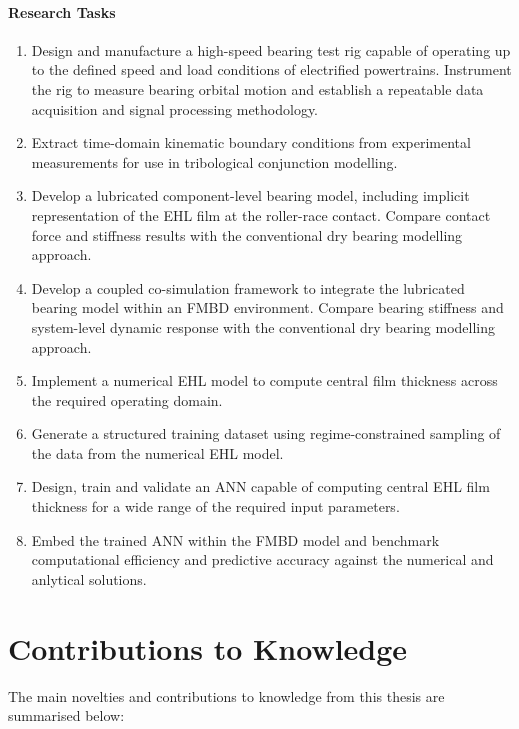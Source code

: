 \paragraph{Research Tasks}
\begin{enumerate}
	\item Design and manufacture a high-speed bearing test rig capable of operating up to the defined speed and load conditions of electrified powertrains. Instrument the rig to measure bearing orbital motion and establish a repeatable data acquisition and signal processing methodology. 
	\item Extract time-domain kinematic boundary conditions from experimental measurements for use in tribological conjunction modelling.
	\item Develop a lubricated component-level bearing model, including implicit representation of the EHL film at the roller-race contact. Compare contact force and stiffness results with the conventional dry bearing modelling approach.
	\item Develop a coupled co-simulation framework to integrate the lubricated bearing model within an FMBD environment. Compare bearing stiffness and system-level dynamic response with the conventional dry bearing modelling approach.
	\item Implement a numerical EHL model to compute central film thickness across the required operating domain.
	\item Generate a structured training dataset using regime-constrained sampling of the data from the numerical EHL model.
	\item Design, train and validate an ANN capable of computing central EHL film thickness for a wide range of the required input parameters.
	\item Embed the trained ANN within the FMBD model and benchmark computational efficiency and predictive accuracy against the numerical and anlytical solutions.
\end{enumerate}

\section{Contributions to Knowledge} \label{Contribution to Knowledge Intro}

The main novelties and contributions to knowledge from this thesis are summarised below:

